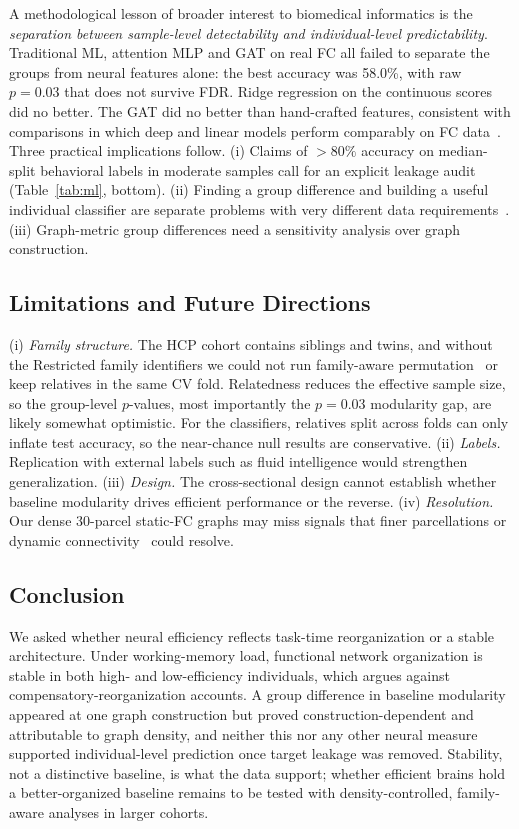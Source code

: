 \documentclass[conference]{IEEEtran}
\begin{document}
A methodological lesson of broader interest to biomedical informatics is the \emph{separation between sample-level detectability and individual-level predictability}. Traditional ML, attention MLP and GAT on real FC all failed to separate the groups from neural features alone: the best accuracy was 58.0\%, with raw $p=0.03$ that does not survive FDR. Ridge regression on the continuous scores did no better. The GAT did no better than hand-crafted features, consistent with comparisons in which deep and linear models perform comparably on FC data~\cite{schulz2020different,he2020deep}. Three practical implications follow. (i) Claims of $>80\%$ accuracy on median-split behavioral labels in moderate samples call for an explicit leakage audit (Table~\ref{tab:ml}, bottom). (ii) Finding a group difference and building a useful individual classifier are separate problems with very different data requirements~\cite{marek2022reproducible}. (iii) Graph-metric group differences need a sensitivity analysis over graph construction.

\subsection{Limitations and Future Directions}
\label{sec:limitations}

(i) \emph{Family structure.} The HCP cohort contains siblings and twins, and without the Restricted family identifiers we could not run family-aware permutation~\cite{winkler2015multi} or keep relatives in the same CV fold. Relatedness reduces the effective sample size, so the group-level $p$-values, most importantly the $p=0.03$ modularity gap, are likely somewhat optimistic. For the classifiers, relatives split across folds can only inflate test accuracy, so the near-chance null results are conservative. (ii) \emph{Labels.} Replication with external labels such as fluid intelligence would strengthen generalization. (iii) \emph{Design.} The cross-sectional design cannot establish whether baseline modularity drives efficient performance or the reverse. (iv) \emph{Resolution.} Our dense 30-parcel static-FC graphs may miss signals that finer parcellations or dynamic connectivity~\cite{shine2016dynamics} could resolve.

\subsection{Conclusion}

We asked whether neural efficiency reflects task-time reorganization or a stable architecture. Under working-memory load, functional network organization is stable in both high- and low-efficiency individuals, which argues against compensatory-reorganization accounts. A group difference in baseline modularity appeared at one graph construction but proved construction-dependent and attributable to graph density, and neither this nor any other neural measure supported individual-level prediction once target leakage was removed. Stability, not a distinctive baseline, is what the data support; whether efficient brains hold a better-organized baseline remains to be tested with density-controlled, family-aware analyses in larger cohorts.
\end{document}
